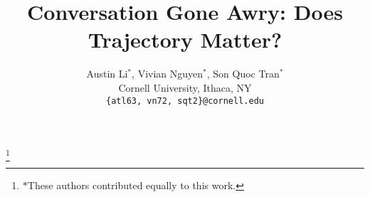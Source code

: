 \documentclass[11pt]{article}
\title{Conversation Gone Awry: Does Trajectory Matter?}
\author{Austin Li$^*$, Vivian Nguyen$^*$, Son Quoc Tran$^*$\\
Cornell University, Ithaca, NY\\
\texttt{\{atl63, vn72, sqt2\}@cornell.edu}}
\newcommand\nnfootnote[1]{%
  \begin{NoHyper}
  \renewcommand\thefootnote{}\footnote{#1}%
  \addtocounter{footnote}{-1}%
  \end{NoHyper}
}
\begin{document}
\maketitle
\nnfootnote{$*$\quad These authors contributed equally to this work.}











%


\appendix
\end{document}
